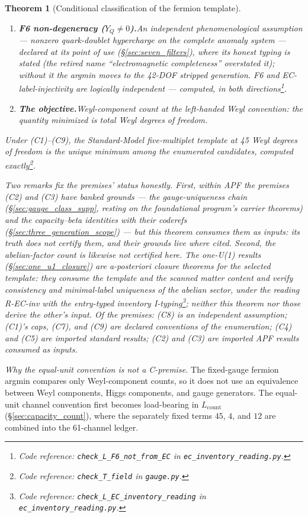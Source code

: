 \documentclass[11pt]{article}
\newtheorem{theorem}{Theorem}[section]
\theoremstyle{definition}
\newcommand{\coderef}[2]{\footnote{Code reference: \texttt{#1} in \texttt{#2}.}}
\begin{document}
\begin{theorem}[Conditional classification of the fermion template]
\begin{enumerate}[label=(C\arabic*),nosep]
  \item \textbf{F6 non-degeneracy ($Y_Q \neq 0$).}\quad An
  independent phenomenological assumption --- nonzero quark-doublet
  hypercharge on the complete anomaly system --- declared at its point
  of use (\S\ref{sec:seven_filters}), where its honest typing is
  stated (the retired name ``electromagnetic completeness'' overstated
  it); without it the argmin moves to the 42-DOF stripped generation.
  F6 and EC-label-injectivity are logically independent --- computed,
  in both directions\coderef{check\_L\_F6\_not\_from\_EC}{ec\_inventory\_reading.py}.
  \item \textbf{The objective.}\quad Weyl-component count at the
  left-handed Weyl convention: the quantity minimized is total Weyl
  degrees of freedom.
\end{enumerate}
Under (C1)--(C9), the Standard-Model five-multiplet template at 45
Weyl degrees of freedom is the unique minimum among the enumerated
candidates, computed
exactly\coderef{check\_T\_field}{gauge.py}.

Two remarks fix the premises' status honestly.  First, within APF the
premises (C2) and (C3) have banked grounds --- the gauge-uniqueness
chain (\S\ref{sec:gauge_class_supp}, resting on the foundational
program's carrier theorems) and the capacity--beta identities with
their coderefs (\S\ref{sec:three_generation_scope}) --- but this
theorem consumes them as \emph{inputs}: its truth does not certify
them, and their grounds live where cited.  Second, the abelian-factor
count is likewise not certified here.  The one-U(1) results
(\S\ref{sec:one_u1_closure}) are a-posteriori closure theorems for
the selected template: they consume the template and the scanned
matter content and verify consistency and minimal-label uniqueness of
the abelian sector, under the reading R-EC-inv with the entry-typed
inventory
I-typing\coderef{check\_L\_EC\_inventory\_reading}{ec\_inventory\_reading.py};
neither this theorem nor those derive the other's input.  Of the
premises: (C8) is an independent assumption; (C1)'s caps, (C7), and
(C9) are declared conventions of the enumeration; (C4) and (C5) are
imported standard results; (C2) and (C3) are imported APF results
consumed as inputs.
\end{theorem}

\noindent\textit{Why the equal-unit convention is not a C-premise.}\quad
The fixed-gauge fermion argmin compares only Weyl-component counts, so
it does not use an equivalence between Weyl components, Higgs
components, and gauge generators.  The equal-unit channel convention
first becomes load-bearing in $L_{\mathrm{count}}$
(\S\ref{sec:capacity_count}), where the separately fixed terms
$45$, $4$, and $12$ are combined into the 61-channel ledger.
\end{document}
